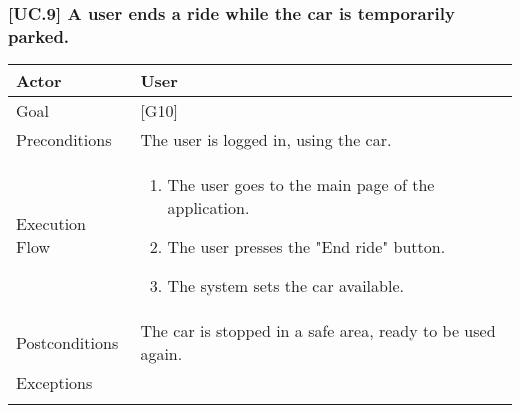 \documentclass[english]{article}
\begin{document}
    \subsubsection{[UC.9] A user ends a ride while the car is temporarily parked.}
    		\begin{tabularx}{\textwidth}{  l  X  }
    			\hline
    			Actor & User\\
    			\hline
    			Goal & [G10]\\
    			\hline
    			Preconditions & The user is logged in, using the car.\\
    			\hline
    			Execution Flow & \begin{enumerate}
    				\item{The user goes to the main page of the application.}
    				\item{The user presses the "End ride" button.}
    				\item{The system sets the car available.}
    				\end{enumerate}\\
    				\hline
    				Postconditions & The car is stopped in a safe area, ready to be used again.\\
    				\hline
    				Exceptions & \begin{itemize}
    					-\\
    				\end{itemize}\\
    				\hline
    		\end{tabularx}
\end{document}

